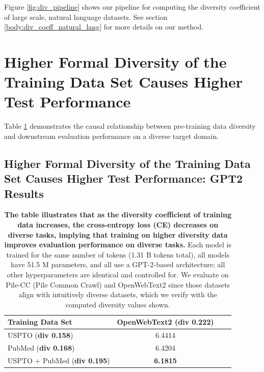 \documentclass[10pt]{article} %
\begin{document}
Figure \ref{fig:div_pipeline} shows our pipeline for computing the diversity coefficient of large scale, natural language datasets. See section \ref{body:div_coeff_natural_lang} for more details on our method.

\section{Higher Formal Diversity of the Training Data Set Causes Higher Test Performance}
Table \ref{tab:div_vs_ppl} demonstrates the causal relationship between pre-training data diversity and downstream evaluation performance on a diverse target domain. 

\subsection{Higher Formal Diversity of the Training Data Set Causes Higher Test Performance: GPT2 Results}

\begin{table}[h!]
    \centering
    \caption{\textbf{The table illustrates that as the diversity coefficient of training data increases, the cross-entropy loss (CE) decreases on diverse tasks, implying that training on higher diversity data improves evaluation performance on diverse tasks.} 
    Each model is trained for the same number of tokens (1.31 B tokens total), 
    all models have 51.5 M parameters, and all use a GPT-2-based architecture; all other hyperparameters are identical and controlled for.
    We evaluate on Pile-CC (Pile Common Crawl) and OpenWebText2 since those datasets align with intuitively diverse datasets, which we verify with the computed diversity values shown.
    }
    \vspace{10pt}
    \begin{tabular}{lccc}
        \toprule
        Training Data Set & OpenWebText2 (\textbf{div 0.222}) \\
        \midrule
        USPTO (\textbf{div 0.158}) & 6.4414 \\
        PubMed (\textbf{div 0.168})  & 6.4204 \\
        USPTO + PubMed (\textbf{div 0.195}) & \textbf{6.1815} \\
        \bottomrule
    \end{tabular}
    \label{tab:div_vs_ppl}
\end{table}
\end{document}
